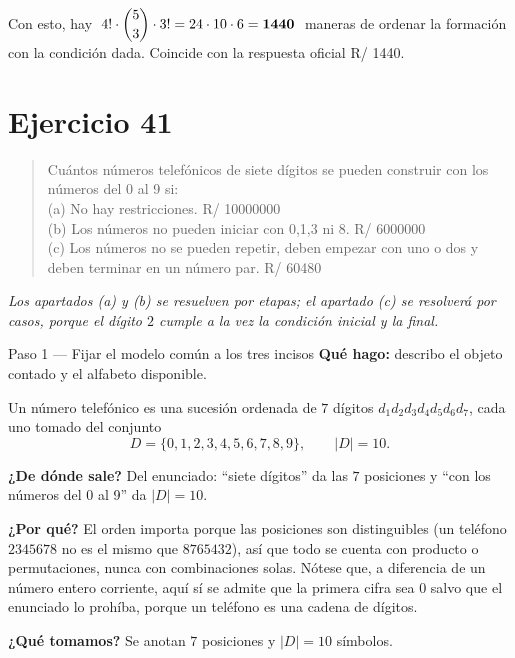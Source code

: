 \documentclass[11pt]{article}
\begin{document}
\begin{resp}
Con esto, hay $\;4!\cdot\dbinom{5}{3}\cdot 3! = 24\cdot 10\cdot 6=\mathbf{1440}\;$ maneras de ordenar la formación con la condición dada. Coincide con la respuesta oficial R/ 1440.
\end{resp}

\section*{Ejercicio 41}

\begin{quote}
Cuántos números telefónicos de siete dígitos se pueden construir con los números del 0 al 9 si:\\[2pt]
(a) No hay restricciones. \hfill R/ 10000000\\
(b) Los números no pueden iniciar con 0,1,3 ni 8. \hfill R/ 6000000\\
(c) Los números no se pueden repetir, deben empezar con uno o dos y deben terminar en un número par. \hfill R/ 60480
\end{quote}

\emph{Los apartados (a) y (b) se resuelven por etapas; el apartado (c) se resolverá por casos, porque el dígito $2$ cumple a la vez la condición inicial y la final.}

\begin{paso}{Paso 1 --- Fijar el modelo común a los tres incisos}
\textbf{Qué hago:} describo el objeto contado y el alfabeto disponible.

Un número telefónico es una sucesión ordenada de $7$ dígitos $d_1d_2d_3d_4d_5d_6d_7$, cada uno tomado del conjunto
\[
  D=\{0,1,2,3,4,5,6,7,8,9\},\qquad |D|=10 .
\]

\textbf{¿De dónde sale?} Del enunciado: ``siete dígitos'' da las $7$ posiciones y ``con los números del 0 al 9'' da $|D|=10$.

\textbf{¿Por qué?} El orden importa porque las posiciones son distinguibles (un teléfono $2345678$ no es el mismo que $8765432$), así que todo se cuenta con producto o permutaciones, nunca con combinaciones solas. Nótese que, a diferencia de un número entero corriente, aquí sí se admite que la primera cifra sea $0$ salvo que el enunciado lo prohíba, porque un teléfono es una cadena de dígitos.

\textbf{¿Qué tomamos?} Se anotan $7$ posiciones y $|D|=10$ símbolos.
\end{paso}
\end{document}
